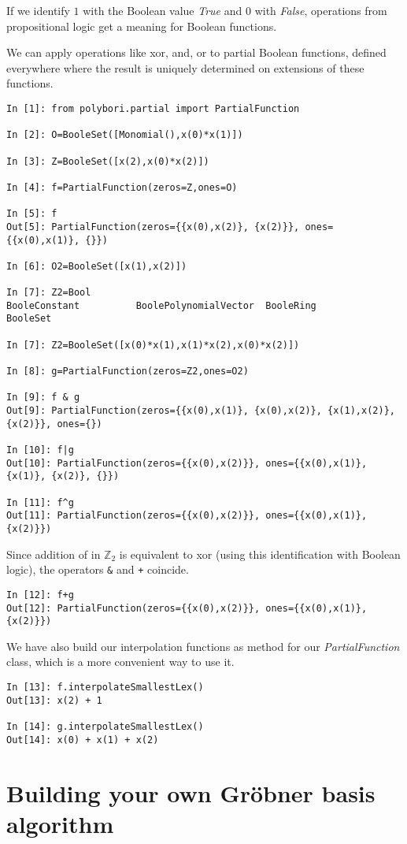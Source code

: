 \documentclass[]{article}
\newcommand{\Groebner}{Gr\"{o}bner\xspace}
\newcommand{\functionname}[1]{\textit{#1}\xspace}
\newcommand{\Ztwo}{\mathbb{Z}_2}
\newcounter{thm}
\begin{document}
If we identify $1$ with the Boolean value \functionname{True} and $0$ with \functionname{False},
operations from propositional logic get a meaning for Boolean functions.

We can apply operations like xor, and, or to partial Boolean functions, defined everywhere where the result is uniquely determined on
extensions of these functions. 

\begin{verbatim}
In [1]: from polybori.partial import PartialFunction

In [2]: O=BooleSet([Monomial(),x(0)*x(1)])

In [3]: Z=BooleSet([x(2),x(0)*x(2)])

In [4]: f=PartialFunction(zeros=Z,ones=O)

In [5]: f
Out[5]: PartialFunction(zeros={{x(0),x(2)}, {x(2)}}, ones={{x(0),x(1)}, {}})

In [6]: O2=BooleSet([x(1),x(2)])

In [7]: Z2=Bool
BooleConstant          BoolePolynomialVector  BooleRing              BooleSet

In [7]: Z2=BooleSet([x(0)*x(1),x(1)*x(2),x(0)*x(2)])

In [8]: g=PartialFunction(zeros=Z2,ones=O2)

In [9]: f & g
Out[9]: PartialFunction(zeros={{x(0),x(1)}, {x(0),x(2)}, {x(1),x(2)}, {x(2)}}, ones={})

In [10]: f|g
Out[10]: PartialFunction(zeros={{x(0),x(2)}}, ones={{x(0),x(1)}, {x(1)}, {x(2)}, {}})

In [11]: f^g
Out[11]: PartialFunction(zeros={{x(0),x(2)}}, ones={{x(0),x(1)}, {x(2)}})
\end{verbatim}

Since addition of in $\Ztwo$ is equivalent to xor (using this identification with Boolean logic), the operators \verb|&| and \verb|+| coincide.
\begin{verbatim}
In [12]: f+g
Out[12]: PartialFunction(zeros={{x(0),x(2)}}, ones={{x(0),x(1)}, {x(2)}})
\end{verbatim}

We have also build our interpolation functions as method for our \functionname{PartialFunction} class, which is a more convenient way to use it.
\begin{verbatim}
In [13]: f.interpolateSmallestLex()
Out[13]: x(2) + 1

In [14]: g.interpolateSmallestLex()
Out[14]: x(0) + x(1) + x(2)
\end{verbatim}
\section{Building your own \Groebner basis algorithm}
\end{document}
